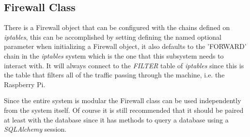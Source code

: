 \begin{enumerate}
\subsection{Firewall Class}
\label{chap4:sec:firewall-sys:firewall-class}
There is a Firewall object that can be configured with the chains defined on
\emph{iptables}, this can be accomplished by setting defining the named optional
parameter when initializing a Firewall object, it also defaults to the 'FORWARD'
chain in the \emph{iptables} system which is the one that this subsystem needs
to interact with. It will always connect to the \emph{FILTER} table of
\emph{iptables} since this is the table that filters all of the traffic passing
through the machine, i.e. the Raspberry Pi.

Since the entire system is modular the Firewall class can be used independently
from the system itself. Of course it is still recommended that it should be
paired at least with the database since it has methods to query a database using
a \emph{SQLAlchemy} session.


\end{enumerate}
